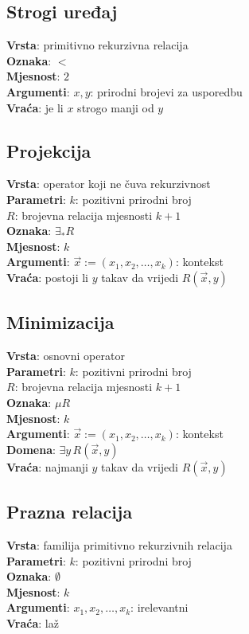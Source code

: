 \subsection{Strogi uređaj}
\textbf{Vrsta}: primitivno rekurzivna relacija\\
\textbf{Oznaka}: $<$\\
\textbf{Mjesnost}: $2$\\
\textbf{Argumenti}: $x,y$: prirodni brojevi za usporedbu\\
\textbf{Vraća}: je li $x$ strogo manji od $y$

\subsection{Projekcija}
\textbf{Vrsta}: operator koji ne čuva rekurzivnost\\
\textbf{Parametri}: $k$: pozitivni prirodni broj\\
$R$: brojevna relacija mjesnosti $k+1$\\
\textbf{Oznaka}: $\exists_*R$\\
\textbf{Mjesnost}: $k$\\
\textbf{Argumenti}: $\vec x:=(x_1,x_2,\dots,x_k)$: kontekst\\
\textbf{Vraća}: postoji li $y$ takav da vrijedi $R(\vec x,y)$

\subsection{Minimizacija}
\textbf{Vrsta}: osnovni operator\\
\textbf{Parametri}: $k$: pozitivni prirodni broj\\
$R$: brojevna relacija mjesnosti $k+1$\\
\textbf{Oznaka}: $\mu R$\\
\textbf{Mjesnost}: $k$\\
\textbf{Argumenti}: $\vec x:=(x_1,x_2,\dots,x_k)$: kontekst\\
\textbf{Domena}: $\exists y\,R(\vec x,y)$\\
\textbf{Vraća}: najmanji $y$ takav da vrijedi $R(\vec x,y)$

\subsection{Prazna relacija}
\textbf{Vrsta}: familija primitivno rekurzivnih relacija\\
\textbf{Parametri}: $k$: pozitivni prirodni broj\\
\textbf{Oznaka}: $\emptyset$\\
\textbf{Mjesnost}: $k$\\
\textbf{Argumenti}: $x_1,x_2,\dots,x_k$: irelevantni\\
\textbf{Vraća}: laž

